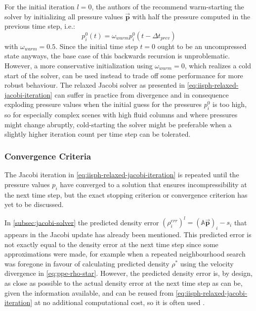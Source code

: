 \documentclass[oneside, a4paper]{book}
\newcommand\vek[1]{\vec{\bm{#1}}}
\newcommand\br[1]{\left(#1\right)}
\begin{document}
    For the initial iteration $l=0$, the authors of the \autocite[original paper]{iisph} recommend warm-starting the solver by initializing all pressure values $\vek{p}$ with half the pressure computed in the previous time step, i.e.:
    \begin{equation}
      p^0_i\br{t} = \omega_{warm}p^0_i\br{t-\Delta t_{prev}}
    \end{equation}
    with $\omega_{warm}=0.5$. Since the initial time step $t=0$ ought to be an uncompressed state anyways, the base case of this backwards recursion is unproblematic. However, a more conservative initialization using $\omega_{warm}=0$, which realizes a cold start of the solver, can be used instead to trade off some performance for more robust behaviour. The relaxed Jacobi solver as presented in \autoref{eq:iisph-relaxed-jacobi-iteration} can suffer in practice from divergence and in consequence exploding pressure values when the initial guess for the pressures $p_i^0$ is too high, so for especially complex scenes with high fluid columns and where pressures might change abruptly, cold-starting the solver might be preferable when a slightly higher iteration count per time step can be tolerated.


  \subsubsection{Convergence Criteria}\label{subsec:iisph-convergence}
  The Jacobi iteration in \autoref{eq:iisph-relaxed-jacobi-iteration} is repeated until the pressure values $p_i$ have converged to a solution that ensures incompressibility at the next time step, but the exact stopping criterion or convergence criterion has yet to be discussed. 

  In \autoref{subsec:jacobi-solver} the predicted density error $\br{\rho^{err}_i}^l = \br{\mathds{A}\vek{p}}_i-s_i$ that appears in the Jacobi update has already been mentioned. This predicted error is not exactly equal to the density error at the next time step since some approximations were made, for example when a repeated neighbourhood search was foregone in favour of calculating predicted density $\rho^*$ using the velocity divergence in \autoref{eq:ppe-rho-star}. However, the predicted density error is, by design, as close as possible to the actual density error at the next time step as can be, given the information available, and can be reused from \autoref{eq:iisph-relaxed-jacobi-iteration} at no additional computational cost, so it is often used \autocites{tutorial2019}{iisph}. 
\end{document}
